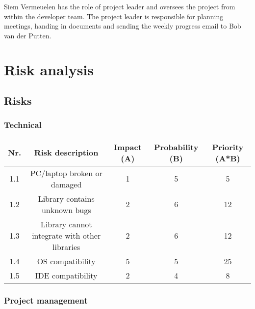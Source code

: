 \documentclass{article} %
\begin{document}
Siem Vermeuelen has the role of project leader and oversees the project from within the developer team. The project leader is responsible for planning meetings, handing in documents and sending the weekly progress email to Bob van der Putten.

\newpage

\section{Risk analysis}

\subsection{Risks}

\subsubsection{Technical}

\begin{center}
    \begin{tabular}{|c | c | c | c | c |}
        \hline
        Nr. & Risk description                              & Impact (A) & Probability (B) & Priority (A*B) \\ [0.5ex]
        \hline\hline
        1.1 & PC/laptop broken or damaged                   & 1          & 5               & 5              \\
        \hline
        1.2 & Library contains unknown bugs                 & 2          & 6               & 12             \\
        \hline
        1.3 & Library cannot integrate with other libraries & 2          & 6               & 12             \\
        \hline
        1.4 & OS compatibility                              & 5          & 5               & 25             \\
        \hline
        1.5 & IDE compatibility                             & 2          & 4               & 8              \\
        \hline
    \end{tabular}
\end{center}

\subsubsection{Project management}
\end{document}
